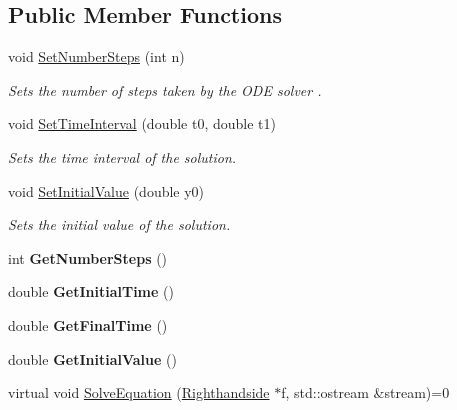 \subsection*{Public Member Functions}
\begin{DoxyCompactItemize}
\item 
\hypertarget{class_abstract_ode_solver_a67a8c0665a9b5d2de74a1307087f23c4}{}void \hyperlink{class_abstract_ode_solver_a67a8c0665a9b5d2de74a1307087f23c4}{Set\+Number\+Steps} (int n)\label{class_abstract_ode_solver_a67a8c0665a9b5d2de74a1307087f23c4}

\begin{DoxyCompactList}\small\item\em Sets the number of steps taken by the O\+D\+E solver . \end{DoxyCompactList}\item 
\hypertarget{class_abstract_ode_solver_aa538dd3bcac6ba5c784dec442333686f}{}void \hyperlink{class_abstract_ode_solver_aa538dd3bcac6ba5c784dec442333686f}{Set\+Time\+Interval} (double t0, double t1)\label{class_abstract_ode_solver_aa538dd3bcac6ba5c784dec442333686f}

\begin{DoxyCompactList}\small\item\em Sets the time interval of the solution. \end{DoxyCompactList}\item 
\hypertarget{class_abstract_ode_solver_a0340b4da640c8c9131363d0525d9223b}{}void \hyperlink{class_abstract_ode_solver_a0340b4da640c8c9131363d0525d9223b}{Set\+Initial\+Value} (double y0)\label{class_abstract_ode_solver_a0340b4da640c8c9131363d0525d9223b}

\begin{DoxyCompactList}\small\item\em Sets the initial value of the solution. \end{DoxyCompactList}\item 
\hypertarget{class_abstract_ode_solver_a6a7f536dd540c74189b2780ef88f4150}{}int {\bfseries Get\+Number\+Steps} ()\label{class_abstract_ode_solver_a6a7f536dd540c74189b2780ef88f4150}

\item 
\hypertarget{class_abstract_ode_solver_a6896791ac972393fb2fe55a974a9e4df}{}double {\bfseries Get\+Initial\+Time} ()\label{class_abstract_ode_solver_a6896791ac972393fb2fe55a974a9e4df}

\item 
\hypertarget{class_abstract_ode_solver_ae1d50acb9cc96e75e05bc1361a0443a6}{}double {\bfseries Get\+Final\+Time} ()\label{class_abstract_ode_solver_ae1d50acb9cc96e75e05bc1361a0443a6}

\item 
\hypertarget{class_abstract_ode_solver_a849db045f2d9f873c89f3ffd568c4f2f}{}double {\bfseries Get\+Initial\+Value} ()\label{class_abstract_ode_solver_a849db045f2d9f873c89f3ffd568c4f2f}

\item 
virtual void \hyperlink{class_abstract_ode_solver_ad7d73b20e9ce5c8f3aab1a15bebe3e4c}{Solve\+Equation} (\hyperlink{class_righthandside}{Righthandside} $\ast$f, std\+::ostream \&stream)=0
\end{DoxyCompactItemize}



